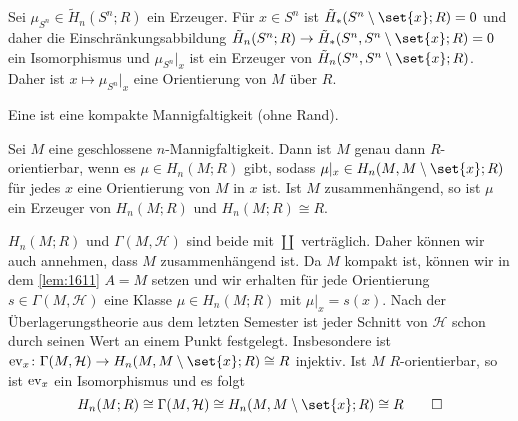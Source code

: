 \begin{beispiel}[{name=[Orientierung der Sphäre]}]
	Sei $\mu_{S^n} \in \tilde{H}_n(S^n;R)$ ein Erzeuger. 
	Für $x \in S^n$ ist $\tilde{H}_*(S^n \setminus \set{x};R)= 0$ und daher die Einschränkungsabbildung $\tilde{H}_n(S^n;R) \to \tilde{H}_*(S^n,S^n \setminus \set{x};R)= 0$ ein Isomorphismus und $\mu_{S^n}|_x$ ist ein Erzeuger von $\tilde{H}_n(S^n, S^n\setminus \set{x};R)$. 
	Daher ist $x \mapsto \mu_{S^n}|_x$ eine Orientierung von $M$ über $R$.
\end{beispiel}

Eine  ist eine kompakte Mannigfaltigkeit (ohne Rand).

\begin{satz}[{name=[{$R$-Orientierbarkeit geschlossener Mannigfaltigkeiten}]}]
	Sei $M$ eine geschlossene $n$-Mannigfaltigkeit. 
	Dann ist $M$ genau dann $R$-orientierbar, wenn es $\mu \in H_n(M;R)$ gibt, sodass $\mu|_x \in H_n(M,M\setminus \set{x};R)$ für jedes $x$ eine Orientierung von $M$ in $x$ ist. 
	Ist $M$ zusammenhängend, so ist $\mu$ ein Erzeuger von $H_n(M;R)$ und $H_n(M;R)\cong R$.
\end{satz}
\begin{beweis}[{name={mit \autoref{lem:1611}}}]
	$H_n(M;R)$ und $\Gamma(M,\mathcal{H})$ sind beide mit $\coprod$ verträglich. 
	Daher können wir auch annehmen, dass $M$ zusammenhängend ist.
	Da $M$ kompakt ist, können wir in dem \autoref{lem:1611} $A=M$ setzen und wir erhalten für jede Orientierung $s \in \Gamma(M,\mathcal{H})$ eine Klasse $\mu \in H_n(M;R)$ mit $\mu|_x=s(x)$. 
	Nach der Überlagerungstheorie aus dem letzten Semester ist jeder Schnitt von $\mathcal{H}$ schon durch seinen Wert an einem Punkt festgelegt. 
	Insbesondere ist $\ev_x \colon\Gamma(M,\mathcal{H}) \to H_n(M,M \setminus \set{x};R ) \cong R$ injektiv. 
	Ist $M$ $R$-orientierbar, so ist $\operatorname{ev}_x$ ein Isomorphismus und es folgt
	\[
		H_n(M;R) \cong \Gamma(M,\mathcal{H}) \cong H_n(M,M \setminus \set{x};R)\cong R \qedhere
	\]
\end{beweis}


